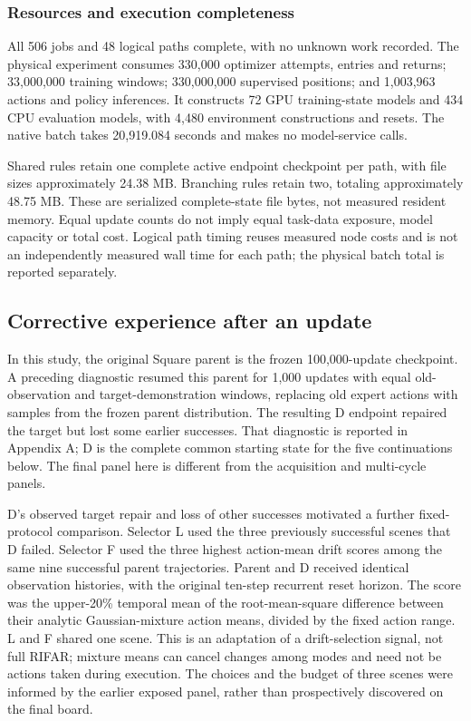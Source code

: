 \documentclass[10pt,letterpaper]{article}
\begin{document}
\subsubsection{Resources and execution
completeness}\label{resources-and-execution-completeness}

All 506 jobs and 48 logical paths complete, with no unknown work
recorded. The physical experiment consumes 330,000 optimizer attempts,
entries and returns; 33,000,000 training windows; 330,000,000 supervised
positions; and 1,003,963 actions and policy inferences. It constructs 72
GPU training-state models and 434 CPU evaluation models, with 4,480
environment constructions and resets. The native batch takes 20,919.084
seconds and makes no model-service calls.

Shared rules retain one complete active endpoint checkpoint per path,
with file sizes approximately 24.38 MB. Branching rules retain two,
totaling approximately 48.75 MB. These are serialized complete-state
file bytes, not measured resident memory. Equal update counts do not
imply equal task-data exposure, model capacity or total cost. Logical
path timing reuses measured node costs and is not an independently
measured wall time for each path; the physical batch total is reported
separately.

\subsection{Corrective experience after an
update}\label{corrective-experience-after-an-update}

In this study, the original Square parent is the frozen 100,000-update
checkpoint. A preceding diagnostic resumed this parent for 1,000 updates
with equal old-observation and target-demonstration windows, replacing
old expert actions with samples from the frozen parent distribution. The
resulting D endpoint repaired the target but lost some earlier
successes. That diagnostic is reported in Appendix A; D is the complete
common starting state for the five continuations below. The final panel
here is different from the acquisition and multi-cycle panels.

D's observed target repair and loss of other successes motivated a
further fixed-protocol comparison. Selector L used the three previously
successful scenes that D failed. Selector F used the three highest
action-mean drift scores among the same nine successful parent
trajectories. Parent and D received identical observation histories,
with the original ten-step recurrent reset horizon. The score was the
upper-20\% temporal mean of the root-mean-square difference between
their analytic Gaussian-mixture action means, divided by the fixed
action range. L and F shared one scene. This is an adaptation of a
drift-selection signal, not full RIFAR; mixture means can cancel changes
among modes and need not be actions taken during execution. The choices
and the budget of three scenes were informed by the earlier exposed
panel, rather than prospectively discovered on the final board.
\end{document}
